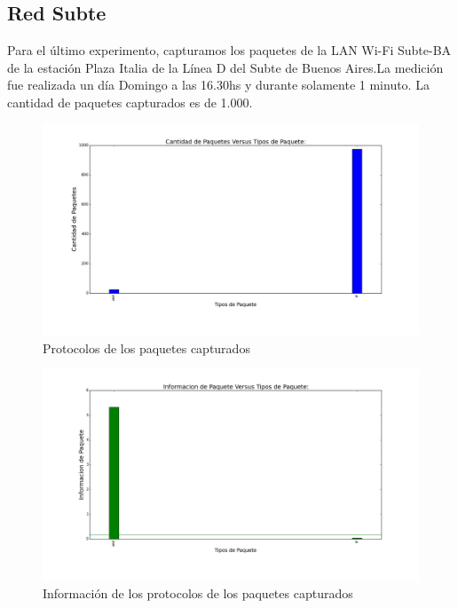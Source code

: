 \subsection{Red Subte}

Para el último experimento, capturamos los paquetes de la LAN Wi-Fi Subte-BA de la estación Plaza Italia de la Línea D del Subte de Buenos Aires.La medición fue realizada un día Domingo a las 16.30hs y durante solamente 1 minuto. La cantidad de paquetes capturados es de 1.000.

\begin{figure}[H]
       \centering
       \includegraphics[width=1\textwidth]{../resultados/subte/histogram_types.png}
       \caption{Protocolos de los paquetes capturados}
       \label{red-hogarena-types}
\end{figure}

\begin{figure}[H]
       \centering
       \includegraphics[width=1\textwidth]{../resultados/subte/histogram_types_information.png}
       \caption{Información de los protocolos de los paquetes capturados}
       \label{red-hogarena-types-info}
\end{figure}


